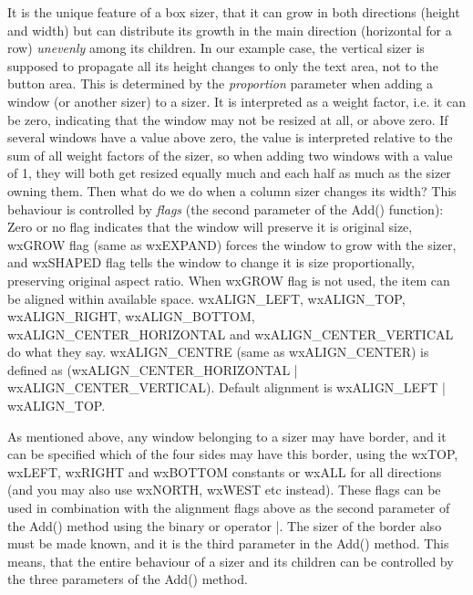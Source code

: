 It is the unique feature of a box sizer, that it can grow in both directions (height and
width) but can distribute its growth in the main direction (horizontal for a row) {\it unevenly} 
among its children. In our example case, the vertical sizer is supposed to propagate all its
height changes to only the text area, not to the button area. This is determined by the {\it proportion} parameter
when adding a window (or another sizer) to a sizer. It is interpreted
as a weight factor, i.e. it can be zero, indicating that the window may not be resized
at all, or above zero. If several windows have a value above zero, the value is interpreted
relative to the sum of all weight factors of the sizer, so when adding two windows with
a value of 1, they will both get resized equally much and each half as much as the sizer
owning them. Then what do we do when a column sizer changes its width? This behaviour is
controlled by {\it flags} (the second parameter of the Add() function): Zero or no flag
indicates that the window will preserve it is original size, wxGROW flag (same as wxEXPAND)
forces the window to grow with the sizer, and wxSHAPED flag tells the window to change it is
size proportionally, preserving original aspect ratio.  When wxGROW flag is not used,
the item can be aligned within available space.  wxALIGN\_LEFT, wxALIGN\_TOP, wxALIGN\_RIGHT,
wxALIGN\_BOTTOM, wxALIGN\_CENTER\_HORIZONTAL and wxALIGN\_CENTER\_VERTICAL do what they say.
wxALIGN\_CENTRE (same as wxALIGN\_CENTER) is defined as (wxALIGN\_CENTER\_HORIZONTAL |
wxALIGN\_CENTER\_VERTICAL).  Default alignment is wxALIGN\_LEFT | wxALIGN\_TOP.

As mentioned above, any window belonging to a sizer may have border, and it can be specified
which of the four sides may have this border, using the wxTOP, wxLEFT, wxRIGHT and wxBOTTOM
constants or wxALL for all directions (and you may also use wxNORTH, wxWEST etc instead). These
flags can be used in combination with the alignment flags above as the second parameter of the
Add() method using the binary or operator |. The sizer of the border also must be made known,
and it is the third parameter in the Add() method. This means, that the entire behaviour of
a sizer and its children can be controlled by the three parameters of the Add() method.

